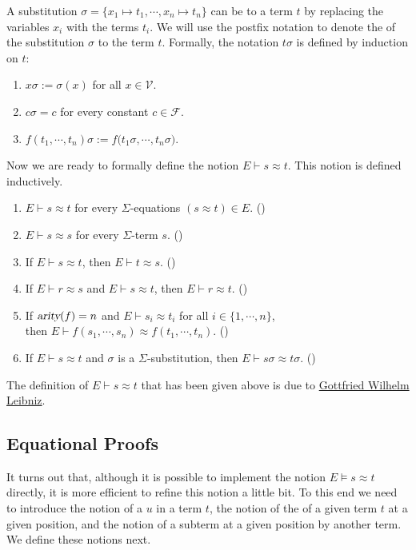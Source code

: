 A substitution $\sigma = \{ x_1 \mapsto t_1, \cdots, x_n \mapsto t_n \}$ can be  to a term $t$
by replacing the variables $x_i$ with the terms $t_i$.  We will use the postfix notation  to denote the
 of the substitution $\sigma$ to the term $t$.  Formally, the notation $t \sigma$ is defined
by induction on $t$:
\begin{enumerate}
\item $x \sigma := \sigma(x)$ \quad for all $x \in \mathcal{V}$.
\item $c \sigma = c$ \quad for every constant $c \in \mathcal{F}$.
\item $f(t_1, \cdots, t_n) \sigma := f\bigl(t_1\sigma, \cdots, t_n\sigma\bigr)$.
\end{enumerate}
Now we are ready to formally define the notion $E \vdash s \approx t$.  This notion is defined inductively.
\begin{enumerate}
\item $E \vdash s \approx t$ \quad for every $\Sigma$-equations $(s \approx t) \in E$. \hspace*{\fill} ()
\item $E \vdash s \approx s$ \quad for every $\Sigma$-term $s$. \hspace*{\fill} ()
\item If $E \vdash s \approx t$, then $E \vdash t \approx s$.  \hspace*{\fill} ()
\item If $E \vdash r \approx s$ and $E \vdash s \approx t$, then $E \vdash r \approx t$.  
      \hspace*{\fill} ()
\item If $\textsl{arity}(f) = n$ and $E \vdash s_i \approx t_i$ for all $i \in \{1,\cdots,n\}$, \\
      then $E \vdash f(s_1,\cdots,s_n) \approx f(t_1,\cdots,t_n)$.
      \hspace*{\fill} ()
\item If $E \vdash s \approx t$ and $\sigma$ is a $\Sigma$-substitution, then $E \vdash s\sigma \approx t\sigma$.
      \hspace*{\fill} ()
\end{enumerate}
The definition of $E \vdash s \approx t$ that has been given above is due to 
\href{https://en.wikipedia.org/wiki/Gottfried_Wilhelm_Leibniz}{Gottfried Wilhelm Leibniz}.

\subsection{Equational Proofs}
It turns out that, although it is possible to implement the notion $E \models s \approx t$ directly, it is more
efficient to refine this notion a little bit.  To this end we need to introduce the notion of a  $u$
in a term $t$, the notion of the  of a given term $t$ at a given position, and the notion of
 a subterm at a given position by another term.  We define these notions next.

